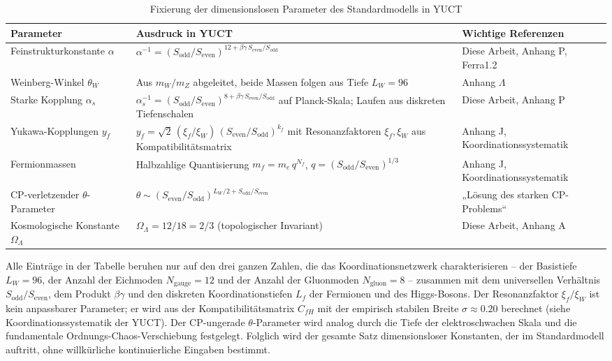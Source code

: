 \documentclass[12pt,a4paper]{article}
\begin{document}
	\begin{table}[htbp]
		\centering
		\caption{Fixierung der dimensionslosen Parameter des Standardmodells in YUCT}
		\label{tab:SMparams}
		\small
		\begin{tabular}{@{}p{3.0cm} p{5.2cm} p{5.2cm}@{}}
			\toprule
			\textbf{Parameter} & \textbf{Ausdruck in YUCT} & \textbf{Wichtige Referenzen} \\
			\midrule
			Feinstrukturkonstante \(\alpha\) &
			\(\alpha^{-1} = (S_{\mathrm{odd}}/S_{\mathrm{even}})^{12+\beta\gamma\,S_{\mathrm{even}}/S_{\mathrm{odd}}}\) &
			Diese Arbeit, Anhang P, Ferra1.2 \\
			Weinberg-Winkel \(\theta_W\) &
			Aus \(m_W/m_Z\) abgeleitet, beide Massen folgen aus Tiefe \(L_W=96\) &
			Anhang \(\Lambda\) \\
			Starke Kopplung \(\alpha_s\) &
			\(\alpha_s^{-1} = (S_{\mathrm{odd}}/S_{\mathrm{even}})^{8+\beta\gamma\,S_{\mathrm{even}}/S_{\mathrm{odd}}}\) auf Planck-Skala; Laufen aus diskreten Tiefenschalen &
			Diese Arbeit, Anhang P \\
			Yukawa-Kopplungen \(y_f\) &
			\(y_f = \sqrt{2}\,(\xi_f/\xi_W)\,(S_{\mathrm{even}}/S_{\mathrm{odd}})^{k_f}\) mit Resonanzfaktoren \(\xi_f,\xi_W\) aus Kompatibilitätsmatrix &
			Anhang J, Koordinationssystematik \\
			Fermionmassen & Halbzahlige Quantisierung \(m_f = m_e\,q^{N_f}\), \(q=(S_{\mathrm{odd}}/S_{\mathrm{even}})^{1/3}\) &
			Anhang J, Koordinationssystematik \\
			CP-verletzender \(\theta\)-Parameter &
			\(\theta \sim (S_{\mathrm{even}}/S_{\mathrm{odd}})^{L_W/2 + S_{\mathrm{odd}}/S_{\mathrm{even}}}\) &
			„Lösung des starken CP-Problems“ \\
			Kosmologische Konstante \(\Omega_\Lambda\) &
			\(\Omega_\Lambda = 12/18 = 2/3\) (topologischer Invariant) &
			Diese Arbeit, Anhang A \\
			\bottomrule
		\end{tabular}
	\end{table}
	
	Alle Einträge in der Tabelle beruhen nur auf den drei ganzen Zahlen, die das Koordinationsnetzwerk charakterisieren – der Basistiefe \(L_W=96\), der Anzahl der Eichmoden \(N_{\mathrm{gauge}}=12\) und der Anzahl der Gluonmoden \(N_{\mathrm{gluon}}=8\) – zusammen mit dem universellen Verhältnis \(S_{\mathrm{odd}}/S_{\mathrm{even}}\), dem Produkt \(\beta\gamma\) und den diskreten Koordinationstiefen \(L_f\) der Fermionen und des Higgs-Bosons. Der Resonanzfaktor \(\xi_f/\xi_W\) ist kein anpassbarer Parameter; er wird aus der Kompatibilitätsmatrix \(C_{fH}\) mit der empirisch stabilen Breite \(\sigma \approx 0.20\) berechnet (siehe Koordinationssystematik der YUCT). Der CP-ungerade \(\theta\)-Parameter wird analog durch die Tiefe der elektroschwachen Skala und die fundamentale Ordnungs-Chaos-Verschiebung festgelegt. Folglich wird der gesamte Satz dimensionsloser Konstanten, der im Standardmodell auftritt, ohne willkürliche kontinuierliche Eingaben bestimmt.
	
\end{document}
